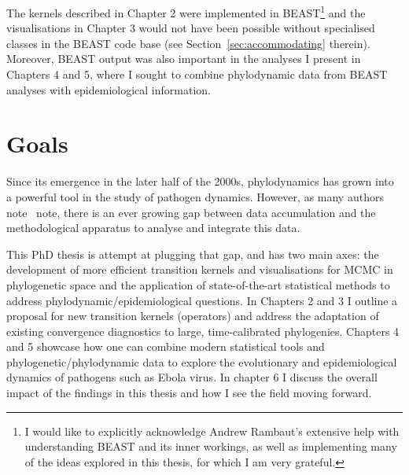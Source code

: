 The kernels described in Chapter 2 were implemented in BEAST\footnote{I would like to explicitly acknowledge Andrew Rambaut's extensive help with understanding BEAST and its inner workings, as well as implementing many of the ideas explored in this thesis, for which I am very grateful.} and the visualisations in Chapter 3 would not have been possible without specialised classes in the BEAST code base (see Section~\ref{sec:accommodating} therein).
Moreover, BEAST output was also important in the analyses I present in Chapters 4 and 5, where I sought to combine phylodynamic data from BEAST analyses with epidemiological information.

\section{Goals}
\label{sec:goals}

Since its emergence in the later half of the 2000s, phylodynamics has grown into a powerful tool in the study of pathogen dynamics.
However, as many authors note~\citep{Volz2013,Pybus2013} note, there is an ever growing gap between data accumulation and the methodological apparatus to analyse and integrate this data.

This PhD thesis is attempt at plugging that gap, and has two main axes: the development of more efficient transition kernels and visualisations for MCMC in phylogenetic space and the application of state-of-the-art statistical methods to address phylodynamic/epidemiological questions.
In Chapters 2 and 3 I outline a proposal for new transition kernels (operators) and address the adaptation of existing convergence diagnostics to large, time-calibrated phylogenies.
Chapters 4 and 5 showcase how one can combine modern statistical tools and phylogenetic/phylodynamic data to explore the evolutionary and epidemiological dynamics of pathogens such as Ebola virus.
In chapter 6 I discuss the overall impact of the findings in this thesis and how I see the field moving forward.

% 